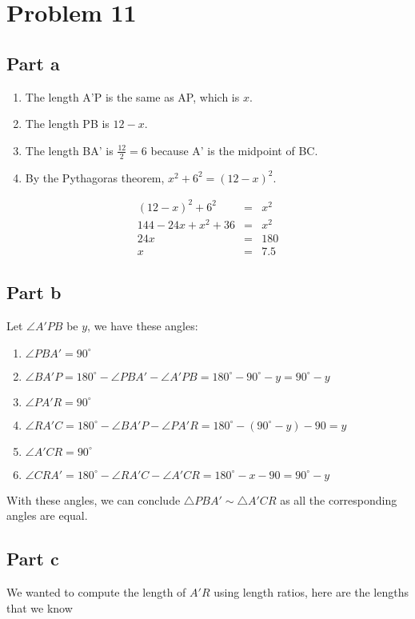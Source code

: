 \section*{Problem 11}
\subsection*{Part a}
\begin{enumerate}
    \item{The length A'P is the same as AP, which is $ x $. }
    \item{The length PB is $ 12 - x $. }
    \item{The length BA' is $ \frac{12}{2} = 6 $ because A' is the midpoint of BC. }
    \item{By the Pythagoras theorem, $ x^2 + 6^2 = (12 - x)^2 $. }
\end{enumerate}

\begin{eqnarray*}
      (12 - x)^2 + 6^2 &=& x^2 \\
  144 - 24x + x^2 + 36 &=& x^2 \\
        24x &=& 180            \\
          x &=& 7.5
\end{eqnarray*}

\subsection*{Part b}
Let $ \angle A'PB $ be $ y $, we have these angles:
\begin{enumerate}
    \item{ $ \angle PBA' = 90^\circ $ }
    \item{ $ \angle BA'P = 180^\circ - \angle PBA' - \angle A'PB = 180^\circ - 90^\circ - y = 90^\circ - y $ }
    \item{ $ \angle PA'R = 90^\circ $ }
    \item{ $ \angle RA'C = 180^\circ - \angle BA'P - \angle PA'R = 180^\circ - (90^\circ - y) - 90 = y $ }
    \item{ $ \angle A'CR = 90^\circ $ }
    \item{ $ \angle CRA' = 180^\circ - \angle RA'C - \angle A'CR = 180^\circ - x - 90 = 90^\circ - y $ }
\end{enumerate}

With these angles, we can conclude $ \triangle PBA' \sim \triangle A'CR $ as all the corresponding angles are equal.
\subsection*{Part c}
We wanted to compute the length of $ A'R $ using length ratios, here are the lengths that we know


